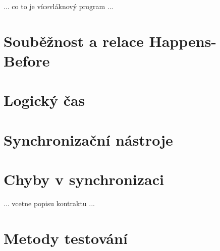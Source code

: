 ... co to je vícevláknový program ...






\section{Souběžnost a relace Happens-Before}
\section{Logický čas}
\section{Synchronizační nástroje}
\section{Chyby v synchronizaci}
... vcetne popisu kontraktu ...
\section{Metody testování}
